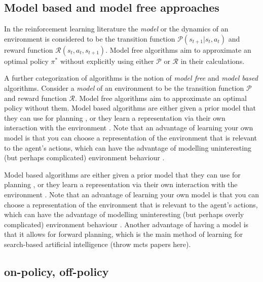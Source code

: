 \documentclass{../main.tex}{subfiles}
\begin{document}
\subsection{Model based and model free approaches}
In the reinforcement learning literature the \textit{model} or the dynamics of an environment is considered to be the transition function $\mathcal{P}(s_{t+1} | s_t, a_t)$ and reward function $\mathcal{R}(s_t, a_t, s_{t+1})$. Model free algorithms aim to approximate an optimal policy $\pi^*$ without explicitly using either $\mathcal{P}$ or $\mathcal{R}$ in their calculations.

A further categorization of algorithms is the notion of \textit{model free} and \textit{model based} algorithms. Consider a \textit{model} of an environment to be the transition function $\mathcal{P}$ and reward function $\mathcal{R}$. Model free algorithms aim to approximate an optimal policy without them. Model based algorithms are either given a prior model that they can use for planning \citep{browne2012survey, Soemers2014}, or they learn a representation via their own interaction with the environment \citep{Sutton1991, Guzdial2017}. Note that an advantage of learning your own model is that you can choose a representation of the environment that is relevant to the agent's actions, which can have the advantage of modelling uninteresting (but perhaps complicated) environment behaviour \citep{Pathak2017}.

Model based algorithms are either given a prior model that they can use for planning \citep{browne2012survey, Soemers2014}, or they learn a representation via their own interaction with the environment \citep{Sutton1991, Guzdial2017, Deisenroth2011}. Note that an advantage of learning your own model is that you can choose a representation of the environment that is relevant to the agent's actions, which can have the advantage of modelling uninteresting (but perhaps overly complicated) environment behaviour \citep{Pathak2017}. Another advantage of having a model is that it allows for forward planning, which is the main method of learning for search-based artificial intelligence (throw mcts papers here).

\subsection{on-policy, off-policy}

\end{document}
